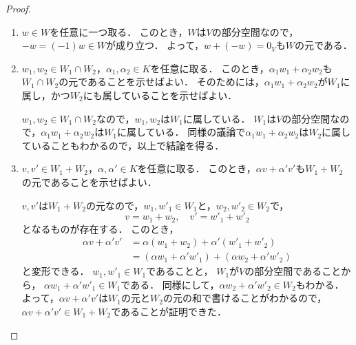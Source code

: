 \begin{proof}
    \begin{enumerate}
        \item $w \in W$を任意に一つ取る．
        このとき，$W$は$V$の部分空間なので，$-w = (-1)w \in W$が成り立つ．
        よって，$w + (-w) = 0_V$も$W$の元である．
        \item $w_1,w_2 \in W_1 \cap W_2$，$\alpha_1,\alpha_2 \in K$を任意に取る．
        このとき，$\alpha_1 w_1 + \alpha_2 w_2$も$W_1 \cap W_2$の元であることを示せばよい．
        そのためには，$\alpha_1 w_1 + \alpha_2 w_2$が$W_1$に属し，かつ$W_2$にも属していることを示せばよい．
        
        $w_1,w_2 \in W_1 \cap W_2$なので，$w_1,w_2$は$W_1$に属している．
        $W_1$は$V$の部分空間なので，$\alpha_1 w_1 + \alpha_2 w_2$は$W_1$に属している．
        同様の議論で$\alpha_1 w_1 + \alpha_2 w_2$は$W_2$に属していることもわかるので，以上で結論を得る．
        \item $v,v' \in W_1+W_2$，$\alpha,\alpha' \in K$を任意に取る．
        このとき，$\alpha v + \alpha' v'$も$W_1 + W_2$の元であることを示せばよい．
        
        $v,v'$は$W_1+W_2$の元なので，$w_1,w'_1 \in W_1$と，$w_2,w'_2 \in W_2$で，
        \[
            v = w_1 + w_2,\quad v' = w'_1 + w'_2
        \]
        となるものが存在する．
        このとき，
        \[
            \begin{aligned}
                \alpha v + \alpha' v' &= \alpha (w_1 + w_2) + \alpha' (w'_1 + w'_2) \\
                &= (\alpha w_1 + \alpha' w'_1) + (\alpha w_2 + \alpha' w'_2)
            \end{aligned}
        \]
        と変形できる．
        $w_1,w'_1 \in W_1$であることと，
        $W_1$が$V$の部分空間であることから，
        $\alpha w_1 + \alpha' w'_1 \in W_1$である．
        同様にして，$\alpha w_2 + \alpha' w'_2 \in W_2$もわかる．
        よって，$\alpha v + \alpha' v'$は$W_1$の元と$W_2$の元の和で書けることがわかるので，$\alpha v + \alpha' v'\in W_1 + W_2$であることが証明できた．
    \end{enumerate}
\end{proof}
